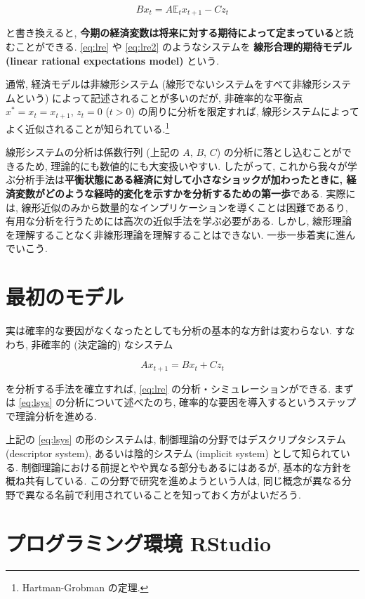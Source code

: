 \documentclass[a4paper]{scrbook}
\theoremstyle{definition}
\begin{document}
\begin{equation} 
  Bx_{t} = A\mathbb{E}_{t}x_{t+1} - Cz_{t} \label{eq:lre2}
\end{equation}

と書き換えると,
\textbf{今期の経済変数は将来に対する期待によって定まっている}と読むことができる.
\eqref{eq:lre} や \eqref{eq:lre2} のようなシステムを
\textbf{線形合理的期待モデル (linear rational expectations model)}
という.

通常, 経済モデルは非線形システム
(線形でないシステムをすべて非線形システムという)
によって記述されることが多いのだが, 非確率的な平衡点
\(x^* = x_t = x_{t+1}\), \(z_t = 0\) (\(t > 0\))
の周りに分析を限定すれば,
線形システムによってよく近似されることが知られている.\footnote{Hartman-Grobman
  の定理.}

線形システムの分析は係数行列 (上記の \(A\), \(B\), \(C\))
の分析に落とし込むことができるため, 理論的にも数値的にも大変扱いやすい.
したがって,
これから我々が学ぶ分析手法は\textbf{平衡状態にある経済に対して小さなショックが加わったときに,
経済変数がどのような経時的変化を示すかを分析するための第一歩}である.
実際には,
線形近似のみから数量的なインプリケーションを導くことは困難であるり,
有用な分析を行うためには高次の近似手法を学ぶ必要がある. しかし,
線形理論を理解することなく非線形理論を理解することはできない.
一歩一歩着実に進んでいこう.

\section{最初のモデル}

実は確率的な要因がなくなったとしても分析の基本的な方針は変わらない.
すなわち, 非確率的 (決定論的) なシステム

\begin{equation}
  Ax_{t+1} = Bx_t + Cz_t \label{eq:lsys}
\end{equation}

を分析する手法を確立すれば, \eqref{eq:lre}
の分析・シミュレーションができる. まずは \eqref{eq:lsys}
の分析について述べたのち,
確率的な要因を導入するというステップで理論分析を進める.

上記の \eqref{eq:lsys} の形のシステムは,
制御理論の分野ではデスクリプタシステム (descriptor system),
あるいは陰的システム (implicit system) として知られている.
制御理論における前提とやや異なる部分もあるにはあるが,
基本的な方針を概ね共有している. この分野で研究を進めようという人は,
同じ概念が異なる分野で異なる名前で利用されていることを知っておく方がよいだろう.

\section{プログラミング環境 RStudio}\label{-rstudio}
\end{document}
